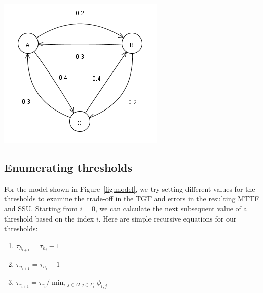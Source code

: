 \documentclass[12pt]{article}
\begin{document}
\begin{minipage}[c]{\textwidth}
	\centering
	\includegraphics{simulation125model.png}
	\label{fig:model}
\end{minipage}

\subsection{Enumerating thresholds}
For the model shown in Figure~\ref{fig:model}, we try setting different values
for the thresholds to examine the trade-off in the TGT and errors in the
resulting MTTF and SSU.  Starting from $i = 0$, we can calculate the next
subsequent value of a threshold based on the index $i$.  Here are simple
recursive equations for our thresholds:

\begin{enumerate}
\item $\tau_{h_{i+1}} = \tau_{h_i} - 1$
\item $\tau_{n_{i+1}} = \tau_{n_i} - 1$
\item $\tau_{r_{i+1}} = \tau_{r_i} / \min_{i,j \in \Omega : j \in \Gamma_i} \phi_{i,j}$
\end{enumerate}
\end{document}
